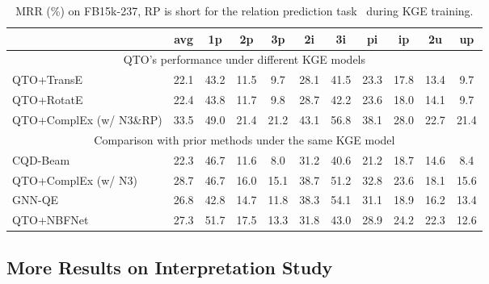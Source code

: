 \begin{table}[t]
    \centering
    \begin{tabular}{lcccccccccc}
        \toprule
        & {\bf avg} & {\bf 1p} & {\bf 2p} & {\bf 3p} & {\bf 2i} & {\bf 3i} & {\bf pi} & {\bf ip} & {\bf 2u} & {\bf up} \\
        \midrule
        \multicolumn{11}{c}{QTO's performance under different KGE models} \\
        \midrule
        QTO+TransE & 22.1 & 43.2 & 11.5 & 9.7 & 28.1 & 41.5 & 23.3 & 17.8 & 13.4 & 9.7 \\
        QTO+RotatE & 22.4 & 43.8 & 11.7 & 9.8 & 28.7 & 42.2 & 23.6 & 18.0 & 14.1 & 9.7 \\
        QTO+ComplEx (w/ N3\&RP) & 33.5 & 49.0 & 21.4 & 21.2 & 43.1 & 56.8 & 38.1 & 28.0 & 22.7 & 21.4 \\
        \midrule
        \multicolumn{11}{c}{Comparison with prior methods under the same KGE model} \\
        \midrule
        CQD-Beam & 22.3 & 46.7 & 11.6 & 8.0 & 31.2 & 40.6 & 21.2 & 18.7 & 14.6 & 8.4 \\
        QTO+ComplEx (w/ N3) & 28.7 & 46.7 & 16.0 & 15.1 & 38.7 & 51.2 & 32.8 & 23.6 & 18.1 & 15.6 \\
        GNN-QE & 26.8 & 42.8 & 14.7 & 11.8 & 38.3 & 54.1 & 31.1 & 18.9 & 16.2 & 13.4 \\
        QTO+NBFNet & 27.3 & 51.7 & 17.5 & 13.3 & 31.8 & 43.0 & 28.9 & 24.2 & 22.3 & 12.6 \\
        \bottomrule
    \end{tabular}
    \caption{MRR (\%) on FB15k-237, RP is short for the relation prediction task~\cite{chen2021relation} during KGE training.}
    \label{tb:kge}
\end{table}

\subsection{More Results on Interpretation Study}
\label{app:inter}

